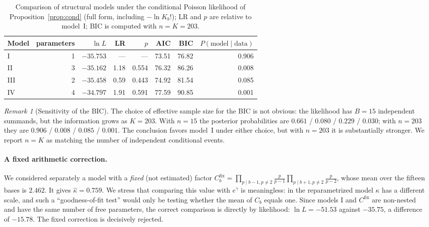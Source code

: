 \documentclass[11pt,a4paper]{article}
\theoremstyle{plain}
\theoremstyle{remark}
\newtheorem{remark}{Remark}
\newcommand{\eg}{e^{\gamma}}
\begin{document}
\begin{table}[t]
\centering
\caption{Comparison of structural models under the conditional Poisson likelihood of
Proposition~\ref{prop:cond} (full form, including $-\ln K_b!$); LR and $p$ are
relative to model~I; BIC is computed with $n=K=203$.}
\label{tab:struct}
\small
\begin{tabular}{lrrrrrrr}
\toprule
Model & parameters & $\ln L$ & LR & $p$ & AIC & BIC & $P(\text{model}\mid\text{data})$\\
\midrule
I & 1 & $-35.753$ & --- & --- & 73.51 & 76.82 & 0.906\\
II & 3 & $-35.162$ & 1.18 & 0.554 & 76.32 & 86.26 & 0.008\\
III & 2 & $-35.458$ & 0.59 & 0.443 & 74.92 & 81.54 & 0.085\\
IV & 4 & $-34.797$ & 1.91 & 0.591 & 77.59 & 90.85 & 0.001\\
\bottomrule
\end{tabular}
\end{table}

\begin{remark}[Sensitivity of the BIC]
The choice of effective sample size for the BIC is not obvious: the likelihood
has $B=15$ independent summands, but the information grows as $K=203$. With
$n=15$ the posterior probabilities are $0.661$ / $0.080$ / $0.229$ / $0.030$;
with $n=203$ they are $0.906$ / $0.008$ / $0.085$ / $0.001$. The conclusion
favors model~I under either choice, but with $n=203$ it is substantially
stronger. We report $n=K$ as matching the number of independent conditional
events.
\end{remark}

\paragraph{A fixed arithmetic correction.} We considered separately a model with
a \emph{fixed} (not estimated) factor
$C^{\mathrm{fix}}_b=\prod_{p\mid b-1,p\ne2}\frac{p}{p-1}\prod_{p\mid b+1,p\ne2}\frac{p}{p-2}$,
whose mean over the fifteen bases is $2.462$. It gives $\hat\kappa=0.759$. We
stress that comparing this value with $\eg$ is meaningless: in the
reparametrized model $\kappa$ has a different scale, and such a ``goodness-of-fit
test'' would only be testing whether the mean of $C_b$ equals one. Since models
I and $C^{\mathrm{fix}}$ are non-nested and have the same number of free
parameters, the correct comparison is directly by likelihood: $\ln L=-51.53$
against $-35.75$, a difference of $-15.78$. The fixed correction is decisively
rejected.
\end{document}
